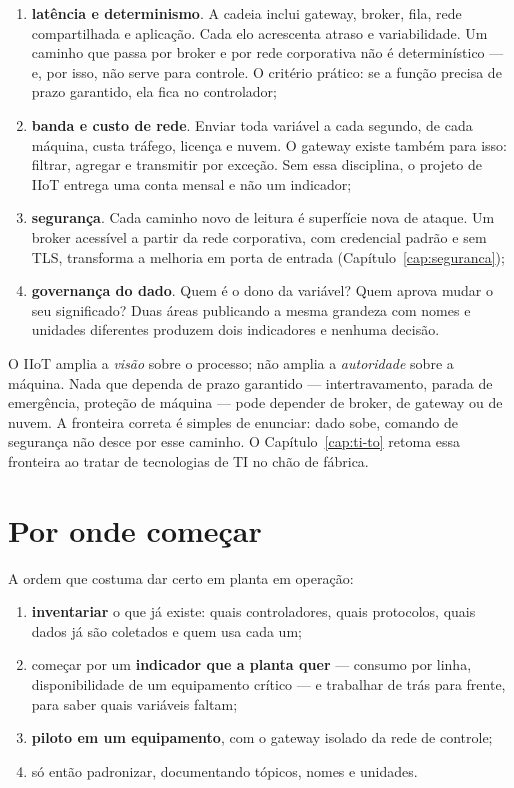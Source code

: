 \begin{enumerate}
  \item \textbf{latência e determinismo}. A cadeia inclui gateway, broker, fila, rede compartilhada e
        aplicação. Cada elo acrescenta atraso e variabilidade. Um caminho que passa por broker e por
        rede corporativa não é determinístico --- e, por isso, não serve para controle. O critério
        prático: se a função precisa de prazo garantido, ela fica no controlador;
  \item \textbf{banda e custo de rede}. Enviar toda variável a cada segundo, de cada máquina, custa
        tráfego, licença e nuvem. O gateway existe também para isso: filtrar, agregar e transmitir por
        exceção. Sem essa disciplina, o projeto de IIoT entrega uma conta mensal e não um indicador;
  \item \textbf{segurança}. Cada caminho novo de leitura é superfície nova de ataque. Um broker
        acessível a partir da rede corporativa, com credencial padrão e sem TLS, transforma a melhoria
        em porta de entrada (Capítulo~\ref{cap:seguranca});
  \item \textbf{governança do dado}. Quem é o dono da variável? Quem aprova mudar o seu significado?
        Duas áreas publicando a mesma grandeza com nomes e unidades diferentes produzem dois
        indicadores e nenhuma decisão.
\end{enumerate}

\begin{atencao}
O IIoT amplia a \emph{visão} sobre o processo; não amplia a \emph{autoridade} sobre a máquina. Nada
que dependa de prazo garantido --- intertravamento, parada de emergência, proteção de máquina ---
pode depender de broker, de gateway ou de nuvem. A fronteira correta é simples de enunciar: dado
sobe, comando de segurança não desce por esse caminho. O Capítulo~\ref{cap:ti-to} retoma essa
fronteira ao tratar de tecnologias de TI no chão de fábrica.
\end{atencao}

\section{Por onde começar}

A ordem que costuma dar certo em planta em operação:

\begin{enumerate}
  \item \textbf{inventariar} o que já existe: quais controladores, quais protocolos, quais dados já
        são coletados e quem usa cada um;
  \item começar por um \textbf{indicador que a planta quer} --- consumo por linha, disponibilidade de
        um equipamento crítico --- e trabalhar de trás para frente, para saber quais variáveis
        faltam;
  \item \textbf{piloto em um equipamento}, com o gateway isolado da rede de controle;
  \item só então padronizar, documentando tópicos, nomes e unidades.
\end{enumerate}

